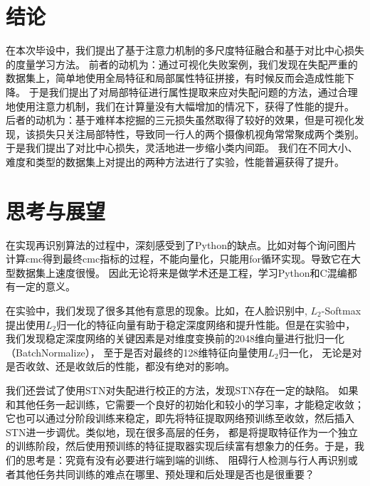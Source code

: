 \section{结论}

在本次毕设中，我们提出了基于注意力机制的多尺度特征融合和基于对比中心损失的度量学习方法。
前者的动机为：通过可视化失败案例，我们发现在失配严重的数据集上，简单地使用全局特征和局部属性特征拼接，有时候反而会造成性能下降。
于是我们提出了对局部特征进行属性提取来应对失配问题的方法，通过合理地使用注意力机制，我们在计算量没有大幅增加的情况下，获得了性能的提升。
后者的动机为：基于难样本挖掘的三元损失虽然取得了较好的效果，但是可视化发现，该损失只关注局部特性，导致同一行人的两个摄像机视角常常聚成两个类别。
于是我们提出了对比中心损失，灵活地进一步缩小类内间距。
我们在不同大小、难度和类型的数据集上对提出的两种方法进行了实验，性能普遍获得了提升。

\section{思考与展望}

在实现再识别算法的过程中，深刻感受到了Python的缺点。比如对每个询问图片计算cmc得到最终cmc指标的过程，不能向量化，只能用for循环实现。导致它在大型数据集上速度很慢。
因此无论将来是做学术还是工程，学习Python和C混编都有一定的意义。

在实验中，我们发现了很多其他有意思的现象。比如，在人脸识别中,
$L_2$-Softmax提出使用$L_2$归一化的特征向量有助于稳定深度网络和提升性能。但是在实验中，我们发现稳定深度网络的关键因素是对维度变换前的2048维向量进行批归一化（BatchNormalize），
至于是否对最终的128维特征向量使用$L_2$归一化，
无论是对是否收敛、还是收敛后的性能，都没有绝对的影响。

我们还尝试了使用STN对失配进行校正的方法，发现STN存在一定的缺陷。
如果和其他任务一起训练，它需要一个良好的初始化和较小的学习率，才能稳定收敛；
它也可以通过分阶段训练来稳定，即先将特征提取网络预训练至收敛，然后插入STN进一步调优。类似地，现在很多高层的任务，
都是将提取特征作为一个独立的训练阶段，然后使用预训练的特征提取器实现后续富有想象力的任务。于是，我们的思考是：究竟有没有必要进行端到端的训练、
阻碍行人检测与行人再识别或者其他任务共同训练的难点在哪里、预处理和后处理是否也是很重要？


\printbibliography[heading=chapbib]
